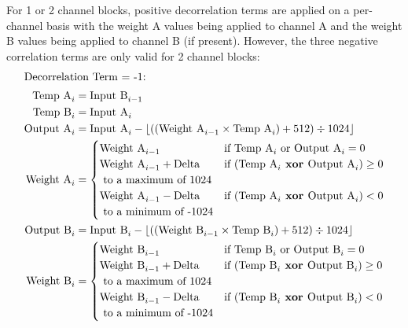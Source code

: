 \clearpage

For 1 or 2 channel blocks, positive decorrelation terms are applied
on a per-channel basis with the weight A values being applied to
channel A and the weight B values being applied to channel B (if present).
However, the three negative correlation terms are only valid for
2 channel blocks:
\begin{align*}
\intertext{Decorrelation Term = -1:}
\text{Temp A}_i &= \text{Input B}_{i - 1} \\
\text{Temp B}_i &= \text{Input A}_i \\
\text{Output A}_i &= \text{Input A}_i - \lfloor((\text{Weight A}_{i - 1} \times \text{Temp A}_i) + 512) \div 1024\rfloor \\
\text{Weight A}_i &=
\begin{cases}
\text{Weight A}_{i - 1} & \text{if } \text{Temp A}_i \text{ or } \text{Output A}_i = 0 \\
\text{Weight A}_{i - 1} + \text{Delta} & \text{if } (\text{Temp A}_i \textbf{ xor } \text{Output A}_i) \geq 0 \\
\text{ to a maximum of 1024} \\
\text{Weight A}_{i - 1} - \text{Delta} & \text{if } (\text{Temp A}_i \textbf{ xor } \text{Output A}_i) < 0 \\
\text{ to a minimum of -1024}
\end{cases} \\
\text{Output B}_i &= \text{Input B}_i - \lfloor((\text{Weight B}_{i - 1} \times \text{Temp B}_i) + 512) \div 1024\rfloor \\
\text{Weight B}_i &=
\begin{cases}
\text{Weight B}_{i - 1} & \text{if } \text{Temp B}_i \text{ or } \text{Output B}_i = 0 \\
\text{Weight B}_{i - 1} + \text{Delta} & \text{if } (\text{Temp B}_i \textbf{ xor } \text{Output B}_i) \geq 0 \\
\text{ to a maximum of 1024} \\
\text{Weight B}_{i - 1} - \text{Delta} & \text{if } (\text{Temp B}_i \textbf{ xor } \text{Output B}_i) < 0 \\
\text{ to a minimum of -1024}
\end{cases}
\end{align*}
